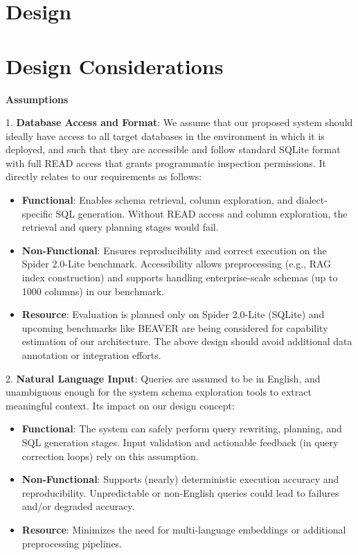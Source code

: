 \section*{\Huge Design}

\section{Design Considerations}

\textbf{Assumptions}

1. \textbf{Database Access and Format}: We assume that our proposed system should ideally have access to all target databases in the environment in which it is deployed, and such that they are accessible and follow standard SQLite format with full READ access that grants programmatic inspection permissions. It directly relates to our requirements as follows:
\begin{itemize}
    \item \textbf{Functional}: Enables schema retrieval, column exploration, and dialect-specific SQL generation. Without READ access and column exploration, the retrieval and query planning stages would fail.
    \item \textbf{Non-Functional}: Ensures reproducibility and correct execution on the Spider 2.0-Lite benchmark. Accessibility allows preprocessing (e.g., RAG index construction) and supports handling enterprise-scale schemas (up to 1000 columns) in our benchmark.
    \item \textbf{Resource}: Evaluation is planned only on Spider 2.0-Lite (SQLite) and upcoming benchmarks like BEAVER are being considered for capability estimation of our architecture. The above design should avoid additional data annotation or integration efforts.
\end{itemize}

2. \textbf{Natural Language Input}: Queries are assumed to be in English, and unambiguous enough for the system schema exploration tools to extract meaningful context. Its impact on our design concept:

\begin{itemize}
    \item \textbf{Functional}: The system can safely perform query rewriting, planning, and SQL generation stages. Input validation and actionable feedback (in query correction loops) rely on this assumption.
    \item \textbf{Non-Functional}: Supports (nearly) deterministic execution accuracy and reproducibility. Unpredictable or non-English queries could lead to failures and/or degraded accuracy.
    \item \textbf{Resource}: Minimizes the need for multi-language embeddings or additional preprocessing pipelines.
\end{itemize}

